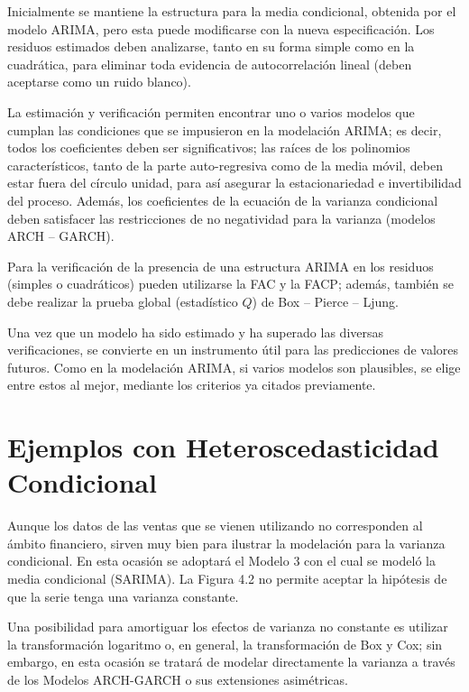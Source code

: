 Inicialmente se mantiene la estructura para la media condicional, obtenida por el modelo ARIMA, pero esta puede modificarse con la nueva especificaci\'{o}n. Los residuos estimados deben analizarse, tanto en su forma simple como en la cuadr\'{a}tica, para eliminar toda evidencia de autocorrelaci\'{o}n lineal (deben aceptarse como un ruido blanco).\newline

La estimaci\'{o}n y verificaci\'{o}n permiten encontrar uno o varios modelos que cumplan las condiciones que se impusieron en la modelaci\'{o}n ARIMA; es decir, todos los coeficientes deben ser significativos; las ra\'{i}ces de los polinomios caracter\'{i}sticos, tanto de la parte auto-regresiva como de la media m\'{o}vil, deben estar fuera del c\'{i}rculo unidad, para as\'{i} asegurar la estacionariedad e invertibilidad del proceso. Adem\'{a}s, los coeficientes de la ecuaci\'{o}n de la varianza condicional deben satisfacer las restricciones de no negatividad para la varianza (modelos ARCH -- GARCH).\newline

Para la verificaci\'{o}n de la presencia de una estructura ARIMA en los residuos (simples o cuadr\'{a}ticos) pueden utilizarse la FAC y la FACP; adem\'{a}s, tambi\'{e}n se debe realizar la prueba global (estad\'{i}stico $Q$) de Box -- Pierce -- Ljung.\newline

Una vez que un modelo ha sido estimado y ha superado las diversas verificaciones, se convierte en un instrumento \'{u}til para las predicciones de valores futuros. Como en la modelaci\'{o}n ARIMA, si varios modelos son plausibles, se elige entre estos al mejor, mediante los criterios ya citados previamente.

\section{Ejemplos con Heteroscedasticidad Condicional}

Aunque los datos de las ventas que se vienen utilizando no corresponden al 
\'{a}mbito financiero, sirven muy bien para ilustrar la modelaci\'{o}n para 
la varianza condicional. En esta ocasi\'{o}n se adoptar\'{a} el Modelo 3 con 
el cual se model\'{o} la media condicional (SARIMA). La Figura 4.2 no 
permite aceptar la hip\'{o}tesis de que la serie tenga una varianza 
constante.

Una posibilidad para amortiguar los efectos de varianza no constante es 
utilizar la transformaci\'{o}n logaritmo o, en general, la 
transformaci\'{o}n de Box y Cox; sin embargo, en esta ocasi\'{o}n se 
tratar\'{a} de modelar directamente la varianza a trav\'{e}s de los Modelos 
ARCH-GARCH o sus extensiones asim\'{e}tricas. 

